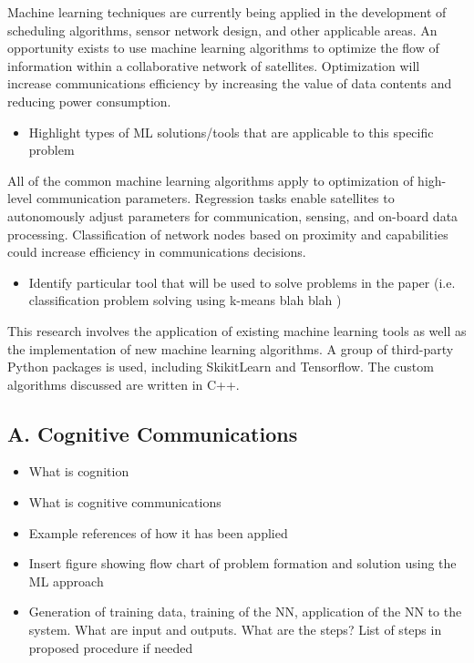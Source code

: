 \documentclass[11pt]{article}
\begin{document}
Machine learning techniques are currently being applied in the development of
scheduling algorithms, sensor network design, and other applicable areas.  An
opportunity exists to use machine learning algorithms to optimize the flow of
information within a collaborative network of satellites.  Optimization will
increase communications efficiency by increasing the value of data contents and
reducing power consumption.

\begin{itemize}
\item Highlight types of ML solutions/tools that are applicable to this specific
problem
\end{itemize}

All of the common machine learning algorithms apply to optimization of
high-level communication parameters.  Regression tasks enable satellites to
autonomously adjust parameters for communication, sensing, and on-board data
processing.  Classification of network nodes based on proximity and capabilities
could increase efficiency in communications decisions.

\begin{itemize}
\item Identify particular tool that will be used to solve problems in the paper
(i.e. classification problem solving using k-means blah blah )
\end{itemize}

This research involves the application of existing machine learning tools as
well as the implementation of new machine learning algorithms.  A group of
third-party Python packages is used, including SkikitLearn and Tensorflow.
The custom algorithms discussed are written in C++.

\subsection*{A. Cognitive Communications}
\label{sec:org55e82c4}

\begin{itemize}
\item What is cognition

\item What is cognitive communications

\item Example references of how it has been applied

\item Insert figure showing flow chart of problem formation and solution using the
ML approach

\item Generation of training data, training of the NN, application of the NN to the
system. What are input and outputs. What are the steps? List of steps in
proposed procedure if needed
\end{itemize}
\end{document}
